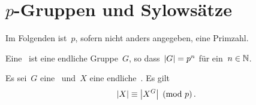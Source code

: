 \section{\texorpdfstring{$p$}{p}-Gruppen und Sylowsätze}

\begin{convention}
  Im Folgenden ist~$p$, sofern nicht anders angegeben, eine Primzahl.
\end{convention}

\begin{definition}
  Eine~ ist eine endliche Gruppe~$G$, so dass~$\lvert G\rvert = p^n$ für ein~$n \in \mathbb{N}$.
\end{definition}

\begin{proposition}
  Es sei~$G$ eine~ und~$X$ eine endliche~.
  Es gilt
  \[
    \card{X} \equiv \card*{X^G} \pmod{p} \,.  
  \]
\end{proposition}

